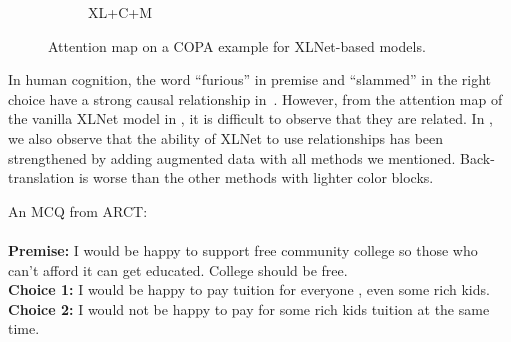 \begin{figure}[th!]
\begin{subfigure}[b]{0.20\textwidth}
\caption{XL+C+M}
\label{fig:copa2_cm}
\end{subfigure}
\caption{Attention map on a COPA example for XLNet-based models.}
\label{fig:copa2_bert}
\end{figure}

In human cognition, the word ``furious'' in premise and ``slammed'' in the right choice 
have a strong causal relationship in~. 
However, from the attention map of the vanilla XLNet model in , 
it is difficult to observe that they are related. 
In , we also observe that 
the ability of XLNet to use relationships has been strengthened by adding augmented data with all 
methods we mentioned. Back-translation is worse than the other methods with lighter color blocks.

\begin{example}\label{ex:arct1}
An MCQ from ARCT:\\ \\
\noindent
\textbf{Premise:} I would be happy to support free community college so those who can't afford it can get educated. College should be free.\\
\textbf{Choice 1:} I would be happy to pay tuition for everyone , even some rich kids.  \checksymbol \\
\textbf{Choice 2:} I would not be happy to pay for some rich kids tuition at the same time. \crosssymbol
\end{example}

